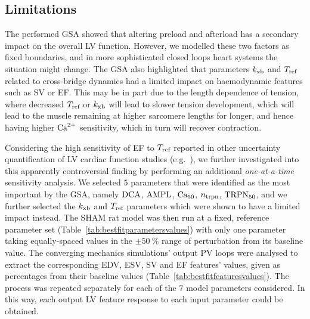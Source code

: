 \subsection{Limitations}\label{sec:ch7limitations}
The performed GSA showed that altering preload and afterload has a secondary impact on the overall LV function. However, we modelled these two factors as fixed boundaries, and in more sophisticated closed loops heart systems the situation might change. The GSA also highlighted that parameters $k_{\textrm{xb}}$ and $T_{\textrm{ref}}$ related to cross-bridge dynamics had a limited impact on haemodynamic features such as SV or EF. This may be in part due to the length dependence of tension, where decreased $T_{\textrm{ref}}$ or $k_{\textrm{xb}}$ will lead to slower tension development, which will lead to the muscle remaining at higher sarcomere lengths for longer, and hence having higher $\textrm{Ca}^{2+}$ sensitivity, which in turn will recover contraction.

\vspace{0.2cm}
Considering the high sensitivity of EF to $T_{\textrm{ref}}$ reported in other uncertainty quantification of LV cardiac function studies (e.g.~\cite{Campos:2020}), we further investigated into this apparently controversial finding by performing an additional \textit{one-at-a-time} sensitivity analysis. We selected $5$ parameters that were identified as the most important by the GSA, namely $\textrm{DCA}$, $\textrm{AMPL}$, $\textrm{Ca}_{50}$, $n_{\textrm{trpn}}$, $\textrm{TRPN}_{50}$, and we further selected the $k_{\textrm{xb}}$ and $T_{\textrm{ref}}$ parameters which were shown to have a limited impact instead. The SHAM rat model was then run at a fixed, reference parameter set (Table~\ref{tab:bestfitparametersvalues}) with only one parameter taking equally-spaced values in the $\pm\SI{50}{\percent}$ range of perturbation from its baseline value. The converging mechanics simulations' output PV loops were analysed to extract the corresponding EDV, ESV, SV and EF features' values, given as percentages from their baseline values (Table~\ref{tab:bestfitfeaturesvalues}). The process was repeated separately for each of the $7$ model parameters considered. In this way, each output LV feature response to each input parameter could be obtained.

